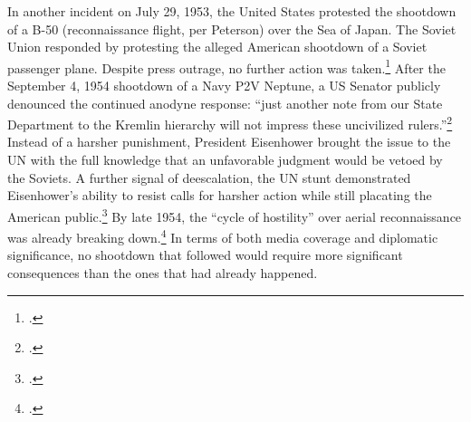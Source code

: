 \documentclass[14pt]{extarticle}
\begin{document}
In another incident on July 29, 1953, the United States protested the shootdown of a B-50 (reconnaissance flight, per Peterson) over the Sea of Japan. The Soviet Union responded by protesting the alleged American shootdown of a Soviet passenger plane. Despite press outrage, no further action was taken.\footcite[p.~47]{farquhar_aerial_2015} After the September 4, 1954 shootdown of a Navy P2V Neptune, a US Senator publicly denounced the continued anodyne response: \enquote{just another note from our State Department to the Kremlin hierarchy will not impress these uncivilized rulers.}\footcite{the_associated_press_ending_1954} Instead of a harsher punishment, President Eisenhower brought the issue to the UN with the full knowledge that an unfavorable judgment would be vetoed by the Soviets. A further signal of deescalation, the UN stunt demonstrated Eisenhower's ability to resist calls for harsher action while still placating the American public.\footcite[p.~47]{farquhar_aerial_2015} By late 1954, the \enquote{cycle of hostility} over aerial reconnaissance was already breaking down.\footcite[p.~49]{farquhar_aerial_2015} In terms of both media coverage and diplomatic significance, no shootdown that followed would require more significant consequences than the ones that had already happened.
\end{document}
